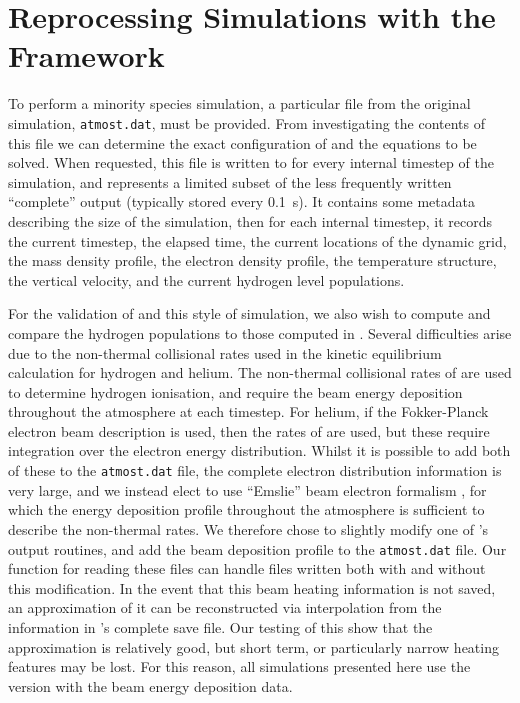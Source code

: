 \section{Reprocessing \Radyn{} Simulations with the \Lw{} Framework}

To perform a minority species simulation, a particular file from the original simulation, \texttt{atmost.dat}, must be provided.
From investigating the contents of this file we can determine the exact configuration of \Lw{} and the equations to be solved.
When requested, this file is written to for every internal timestep of the \Radyn{} simulation, and represents a limited subset of the less frequently written ``complete'' output (typically stored every \SI{0.1}{\second}).
It contains some metadata describing the size of the simulation, then for each internal timestep, it records the current timestep, the elapsed time, the current locations of the dynamic grid, the mass density profile, the electron density profile, the temperature structure, the vertical velocity, and the current hydrogen level populations.

For the validation of \Lw{} and this style of simulation, we also wish to compute and compare the hydrogen populations to those computed in \Radyn{}.
Several difficulties arise due to the non-thermal collisional rates used in the kinetic equilibrium calculation for hydrogen and helium.
The non-thermal collisional rates of \citet{1993Fang} are used to determine hydrogen ionisation, and require the beam energy deposition throughout the atmosphere at each timestep.
For helium, if the Fokker-Planck electron beam description is used, then the rates of \citet{Arnaud1985} are used, but these require integration over the electron energy distribution.
Whilst it is possible to add both of these to the \texttt{atmost.dat} file, the complete electron distribution information is very large, and we instead elect to use ``Emslie'' beam electron formalism \citep{Emslie1978}, for which the energy deposition profile throughout the atmosphere is sufficient to describe the non-thermal rates.
We therefore chose to slightly modify one of \Radyn{}'s output routines, and add the beam deposition profile to the \texttt{atmost.dat} file.
Our function for reading these files can handle files written both with and without this modification.
In the event that this beam heating information is not saved, an approximation of it can be reconstructed via interpolation from the information in \Radyn{}'s complete save file.
Our testing of this show that the approximation is relatively good, but short term, or particularly narrow heating features may be lost.
For this reason, all simulations presented here use the version with the beam energy deposition data.

